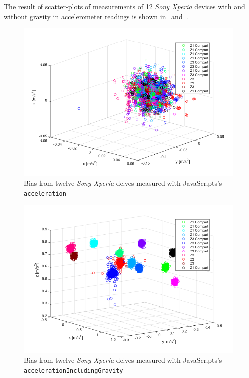 The result of scatter-plots of measurements of 12 \textit{Sony Xperia} devices with and without gravity in accelerometer readings is shown in~ and~.
\begin{figure}[H]
	\centering
	\includegraphics[scale=0.6]{img/res-measure1-scatter-notG}
	\caption{Bias from twelve \textit{Sony Xperia} deives measured with JavaScripts's \texttt{acceleration}}
	\label{fig:scatter-withoutGrav}
\end{figure}
\begin{figure}[H]
	\centering
	\includegraphics[scale=0.6]{img/res-measure1-scatter-inclG}
	\caption{Bias from twelve \textit{Sony Xperia} deives measured with JavaScripts's \texttt{accelerationIncludingGravity}}
	\label{fig:scatter-withGrav}
\end{figure}

